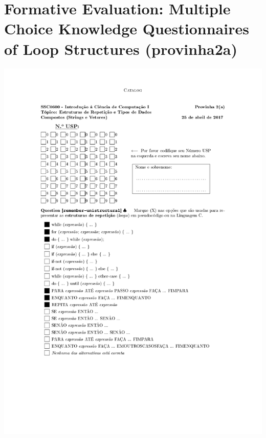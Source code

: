 \section{Formative Evaluation: Multiple Choice Knowledge Questionnaires of Loop Structures (provinha2a)}
\label{annex:second-study-pre}
\includegraphics[page=1,width=1\textwidth]{images/annex/second-study-pre.pdf}
\newpage
